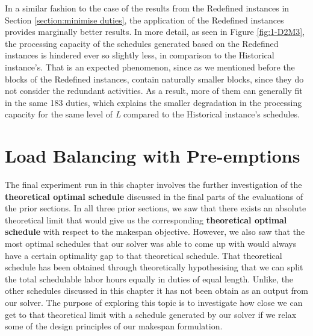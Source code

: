 \vspace{\baselineskip}
\noindent
In a similar fashion to the case of the results from the Redefined instances in Section \ref{section:minimise duties}, the application of the Redefined instances provides marginally better results. In more detail, as seen in Figure \ref{fig:1-D2M3}, the processing capacity of the schedules generated based on the Redefined instances is hindered ever so slightly less, in comparison to the Historical instance's. That is an expected phenomenon, since as we mentioned before the blocks of the Redefined instances, contain naturally smaller blocks, since they do not consider the redundant activities. As a result, more of them can generally fit in the same 183 duties, which explains the smaller degradation in the processing capacity for the same level of \textit{L} compared to the Historical instance's schedules. 

\section{Load Balancing with Pre-emptions}
\label{section: Pre-emptive}
The final experiment run in this chapter involves the further investigation of the \textbf{theoretical optimal schedule} discussed in the final parts of the evaluations of the prior sections. In all three prior sections, we saw that there exists an absolute theoretical limit that would give us the corresponding \textbf{theoretical optimal schedule} with respect to the makespan objective. However, we also saw that the most optimal schedules that our solver was able to come up with would always have a certain optimality gap to that theoretical schedule. That theoretical schedule has been obtained through theoretically hypothesising that we can split the total schedulable labor hours equally in duties of equal length. Unlike, the other schedules discussed in this chapter it has not been obtain as an output from our solver. The purpose of exploring this topic is to investigate how close we can get to that theoretical limit with a schedule generated by our solver if we relax some of the design principles of our makespan formulation. 


